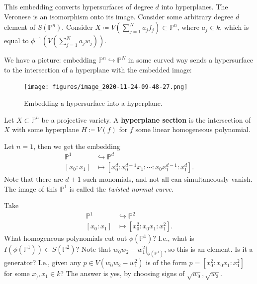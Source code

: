 \begin{remark}

This embedding converts hypersurfaces of degree \(d\) into hyperplanes.
The Veronese is an isomorphism onto its image. Consider some arbitrary
degree \(d\) element of \(S({\mathbb{P}}^n)\). Consider
\(X \coloneqq V(\sum_{j=1}^N a_j f_j) \subset{\mathbb{P}}^n\), where
\(a_j\in k\), which is equal to \(\phi^{-1}(V(\sum_{j=1}^N a_j w_j ))\).


We have a picture: embedding
\({\mathbb{P}}^n\hookrightarrow{\mathbb{P}}^N\) in some curved way sends
a hypersurface to the intersection of a hyperplane with the embedded
image:

\begin{figure}
\centering
\texttt{[image: figures/image\_2020-11-24-09-48-27.png]}
\caption{Embedding a hypersurface into a hyperplane.}
\end{figure}

\end{remark}

\begin{definition}

Let \(X \subset{\mathbb{P}}^n\) be a projective variety. A
\textbf{hyperplane section} is the intersection of \(X\) with some
hyperplane \(H \coloneqq V(f)\) for \(f\) some linear homogeneous
polynomial.

\end{definition}

\begin{example}

Let \(n=1\), then we get the embedding
\begin{align*}  
{\mathbb{P}}^1 &\hookrightarrow{\mathbb{P}}^d \\
[x_0: x_1] &\mapsto [x_0^d: x_0^{d-1}x_1 : \cdots : x_0 x_1^{d-1} : x_1^d]
.\end{align*}
Note that there are \(d+1\) such monomials, and not all can
simultaneously vanish. The image of this \({\mathbb{P}}^1\) is called
the \emph{twisted normal curve}.

\end{example}

\begin{example}[?]

Take
\begin{align*}  
{\mathbb{P}}^1 &\hookrightarrow{\mathbb{P}}^2 \\
[x_0 : x_1] &\mapsto [x_0^2 : x_0 x_1: x_1^2]
.\end{align*}
What homogeneous polynomials cut out \(\phi({\mathbb{P}}^1)\)? I.e.,
what is \(I(\phi({\mathbb{P}}^1)) \subset S({\mathbb{P}}^2)\)? Note that
\(w_0 w_2 - w_1^2 { \left.{{}} \right|_{{\phi({\mathbb{P}}^1)}} }\), so
this is an element. Is it a generator? I.e., given any
\(p\in V(w_0 w_2 - w_1^2)\) is of the form
\(p = [x_0^2 : x_0 x_1: x_1^2]\) for some \(x_), x_1 \in k\)? The answer
is yes, by choosing signs of \(\sqrt{w_0}, \sqrt{w_2}\).

\end{example}

